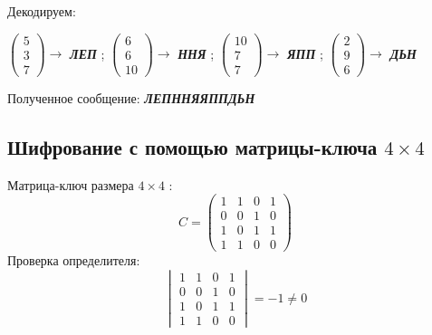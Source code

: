 \documentclass[a5paper, 10pt]{article}
\theoremstyle{definition}
\theoremstyle{plain}
\theoremstyle{remark}
\begin{document}
Декодируем:
\begin{center}
 $ \begin{pmatrix}
5 \\
3\\
7
\end{pmatrix} \to$ \textbf{\textit{ЛЕП}} ;
 $ \begin{pmatrix}
6 \\
6\\
10
\end{pmatrix} \to$ \textbf{\textit{ННЯ}} ;
 $ \begin{pmatrix}
10 \\
7\\
7
\end{pmatrix} \to$ \textbf{\textit{ЯПП}} ;
 $ \begin{pmatrix}
 2 \\
9\\
6
\end{pmatrix} \to$ \textbf{\textit{ДЬН}}  \\

\end{center}
Полученное сообщение:  \textbf{\textit{ЛЕПННЯЯППДЬН}}

\subsection{Шифрование с помощью матрицы-ключа $4 \times 4$}
Матрица-ключ размера  $4 \times 4$ :
\begin{equation}
C =
\begin{pmatrix}
1 & 1 & 0 & 1\\
0 & 0 & 1 & 0 \\
1 & 0 & 1 & 1 \\
1 & 1 & 0 & 0
\end{pmatrix}
\end{equation}
Проверка определителя:
\begin{equation}
\begin{vmatrix}
1 & 1 & 0 & 1\\
0 & 0 & 1 & 0 \\
1 & 0 & 1 & 1 \\
1 & 1 & 0 & 0
\end{vmatrix}
= -1 \neq 0
\end{equation}
\end{document}
